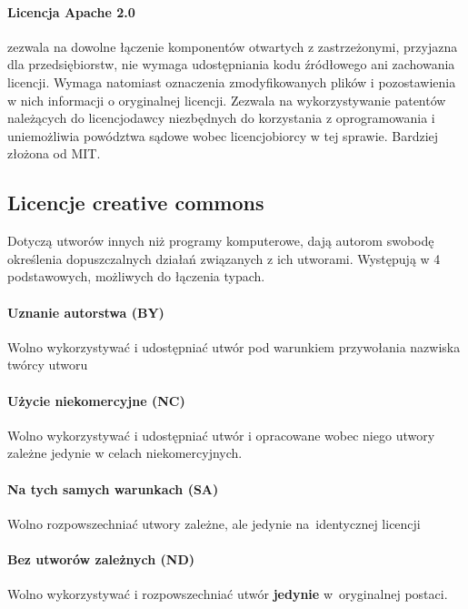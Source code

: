 \documentclass{article}
\begin{document}
\paragraph{Licencja Apache 2.0}

zezwala na dowolne łączenie komponentów otwartych z zastrzeżonymi, przyjazna dla przedsiębiorstw, nie wymaga udostępniania kodu źródłowego ani zachowania licencji. Wymaga natomiast oznaczenia zmodyfikowanych plików i pozostawienia w nich informacji o oryginalnej licencji. Zezwala na wykorzystywanie patentów należących do licencjodawcy niezbędnych do korzystania z oprogramowania i uniemożliwia powództwa sądowe wobec licencjobiorcy w tej sprawie. Bardziej złożona od MIT.

\subsection{Licencje creative commons}

Dotyczą utworów innych niż programy komputerowe, dają autorom swobodę określenia dopuszczalnych działań związanych z ich utworami. Występują w 4 podstawowych, możliwych do łączenia typach.

\paragraph{Uznanie autorstwa (BY)}

Wolno wykorzystywać i udostępniać utwór pod warunkiem przywołania nazwiska twórcy utworu

\paragraph{Użycie niekomercyjne (NC)}

Wolno wykorzystywać i udostępniać utwór i opracowane wobec niego utwory zależne jedynie w celach niekomercyjnych.

\paragraph{Na tych samych warunkach (SA)}

Wolno rozpowszechniać utwory zależne, ale jedynie na~identycznej licencji

\paragraph{Bez utworów zależnych (ND)}

Wolno wykorzystywać i rozpowszechniać utwór \textbf{jedynie} w~oryginalnej postaci.
\end{document}
